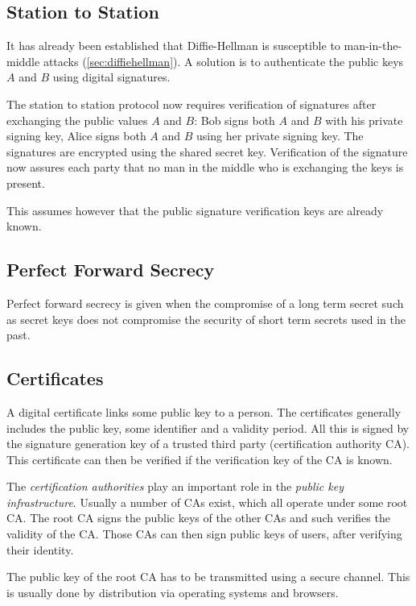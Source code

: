 \subsection{Station to Station}
It has already been established that Diffie-Hellman is susceptible to
man-in-the-middle attacks (\cref{sec:diffiehellman}). A solution is to
authenticate the public keys $A$ and $B$ using digital signatures.

The station to station protocol now requires verification of signatures after
exchanging the public values $A$ and $B$: Bob signs both $A$ and $B$ with his
private signing key, Alice signs both $A$ and $B$ using her private signing key.
The signatures are encrypted using the shared secret key. Verification of the
signature now assures each party that no man in the middle who is exchanging the
keys is present.

This assumes however that the public signature verification keys are already
known.

\subsection{Perfect Forward Secrecy}
Perfect forward secrecy is given when the compromise of a long term secret such
as secret keys does not compromise the security of short term secrets used in
the past.

\subsection{Certificates}
A digital certificate links some public key to a person. The certificates
generally includes the public key, some identifier and a validity period. All
this is signed by the signature generation key of a trusted third party
(certification authority CA). This certificate can then be verified if the
verification key of the CA is known.

The \emph{certification authorities} play an important role in the \emph{public
key infrastructure}. Usually a number of CAs exist, which all operate under some
root CA. The root CA signs the public keys of the other CAs and such verifies
the validity of the CA. Those CAs can then sign public keys of users, after
verifying their identity.

The public key of the root CA has to be transmitted using a secure channel. This
is usually done by distribution via operating systems and browsers.

